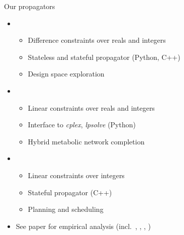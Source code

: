 \documentclass[t,fleqn]{beamer}
\begin{document}
\begin{frame}{Our propagators}
  \smallskip
  \begin{itemize}
  \item \clingo[DL]
    \begin{itemize}
    \item Difference constraints over reals and integers
    \item Stateless and stateful propagator (Python, C++)
    \item Design space exploration 
    \end{itemize}
    \smallskip
  \item \clingo[LP]
    \begin{itemize}
    \item Linear constraints over reals and integers
    \item Interface to \textit{cplex}, \textit{lpsolve} (Python)
    \item Hybrid metabolic network completion
    \end{itemize}
    \smallskip
  \item {}
    \begin{itemize}
    \item Linear constraints over integers
    \item Stateful propagator (C++)
    \item Planning and scheduling
    \end{itemize}
  \item See paper for empirical analysis (incl.\ \dingo, \mingo, \ezcsp, \ezsmt)
  \end{itemize}
\end{frame}
\end{document}
